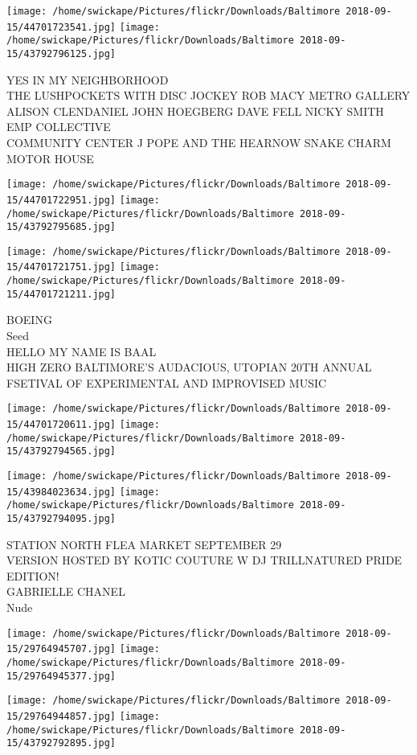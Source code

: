 \documentclass[10pt,letterpaper]{article}
\begin{document}
\texttt{[image: /home/swickape/Pictures/flickr/Downloads/Baltimore 2018-09-15/44701723541.jpg]}
\texttt{[image: /home/swickape/Pictures/flickr/Downloads/Baltimore 2018-09-15/43792796125.jpg]}

YES IN MY NEIGHBORHOOD\\
THE LUSHPOCKETS WITH DISC JOCKEY ROB MACY METRO GALLERY\\
ALISON CLENDANIEL JOHN HOEGBERG DAVE FELL NICKY SMITH EMP COLLECTIVE\\
COMMUNITY CENTER J POPE AND THE HEARNOW SNAKE CHARM MOTOR HOUSE
\pagebreak

\texttt{[image: /home/swickape/Pictures/flickr/Downloads/Baltimore 2018-09-15/44701722951.jpg]}
\texttt{[image: /home/swickape/Pictures/flickr/Downloads/Baltimore 2018-09-15/43792795685.jpg]}

\texttt{[image: /home/swickape/Pictures/flickr/Downloads/Baltimore 2018-09-15/44701721751.jpg]}
\texttt{[image: /home/swickape/Pictures/flickr/Downloads/Baltimore 2018-09-15/44701721211.jpg]}

BOEING\\
Seed\\
HELLO MY NAME IS BAAL\\
HIGH ZERO BALTIMORE'S AUDACIOUS, UTOPIAN 20TH ANNUAL FSETIVAL OF EXPERIMENTAL AND IMPROVISED MUSIC
\pagebreak

\texttt{[image: /home/swickape/Pictures/flickr/Downloads/Baltimore 2018-09-15/44701720611.jpg]}
\texttt{[image: /home/swickape/Pictures/flickr/Downloads/Baltimore 2018-09-15/43792794565.jpg]}

\texttt{[image: /home/swickape/Pictures/flickr/Downloads/Baltimore 2018-09-15/43984023634.jpg]}
\texttt{[image: /home/swickape/Pictures/flickr/Downloads/Baltimore 2018-09-15/43792794095.jpg]}

STATION NORTH FLEA MARKET SEPTEMBER 29\\
VERSION HOSTED BY KOTIC COUTURE W DJ TRILLNATURED PRIDE EDITION!\\
GABRIELLE CHANEL\\
Nude
\pagebreak

\texttt{[image: /home/swickape/Pictures/flickr/Downloads/Baltimore 2018-09-15/29764945707.jpg]}
\texttt{[image: /home/swickape/Pictures/flickr/Downloads/Baltimore 2018-09-15/29764945377.jpg]}

\texttt{[image: /home/swickape/Pictures/flickr/Downloads/Baltimore 2018-09-15/29764944857.jpg]}
\texttt{[image: /home/swickape/Pictures/flickr/Downloads/Baltimore 2018-09-15/43792792895.jpg]}
\end{document}
